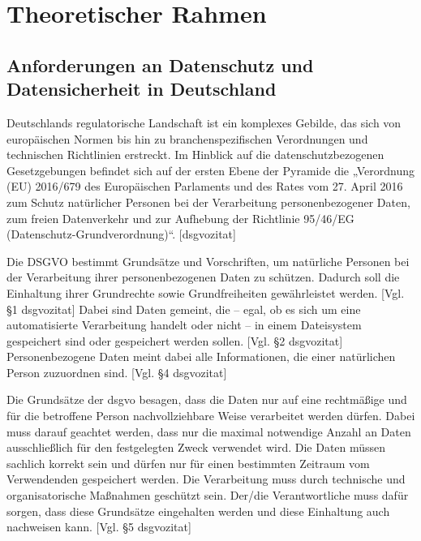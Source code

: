 


\chapter{Theoretischer Rahmen}
\label{cha:Theoretischer_Rahmen}

\section{Anforderungen an Datenschutz und Datensicherheit in Deutschland}
\label{sec:Anforderunge}

Deutschlands regulatorische Landschaft ist ein komplexes Gebilde, das sich von europäischen Normen bis hin zu branchenspezifischen Verordnungen und technischen Richtlinien erstreckt. Im Hinblick auf die datenschutzbezogenen Gesetzgebungen befindet sich auf der ersten Ebene der Pyramide die „Verordnung (EU) 2016/679 des Europäischen Parlaments und des Rates vom 27. April 2016 zum Schutz natürlicher Personen bei der Verarbeitung personenbezogener Daten, zum freien Datenverkehr und zur Aufhebung der Richtlinie 95/46/EG (Datenschutz-Grundverordnung)“. [\gls{dsgvozitat}]

Die DSGVO bestimmt Grundsätze und Vorschriften, um natürliche Personen bei der Verarbeitung ihrer personenbezogenen Daten zu schützen. Dadurch soll die Einhaltung ihrer Grundrechte sowie Grundfreiheiten gewährleistet werden. [Vgl. §1 \gls{dsgvozitat}] Dabei sind Daten gemeint, die – egal, ob es sich um eine automatisierte Verarbeitung handelt oder nicht – in einem Dateisystem gespeichert sind oder gespeichert werden sollen. [Vgl. §2 \gls{dsgvozitat}] 
Personenbezogene Daten meint dabei alle Informationen, die einer natürlichen Person zuzuordnen sind. [Vgl. §4 \gls{dsgvozitat}]

Die Grundsätze der \gls{dsgvo} besagen, dass die Daten nur auf eine rechtmäßige und für die betroffene Person nachvollziehbare Weise verarbeitet werden dürfen. Dabei muss darauf geachtet werden, dass nur die maximal notwendige Anzahl an Daten ausschließlich für den festgelegten Zweck verwendet wird. Die Daten müssen sachlich korrekt sein und dürfen nur für einen bestimmten Zeitraum vom Verwendenden gespeichert werden. Die Verarbeitung muss durch technische und organisatorische Maßnahmen geschützt sein. Der/die Verantwortliche muss dafür sorgen, dass diese Grundsätze eingehalten werden und diese Einhaltung auch nachweisen kann. [Vgl. §5 \gls{dsgvozitat}]

